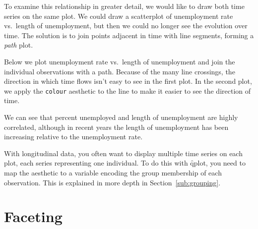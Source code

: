 % 


To examine this relationship in greater detail, we would like to draw both time series on the same plot. We could draw a scatterplot of unemployment rate vs.\ length of unemployment, but then we could no longer see the evolution over time. The solution is to join points adjacent in time with line segments, forming a \emph{path} plot.

Below we plot unemployment rate vs.\ length of unemployment and join the individual observations with a path. Because of the many line crossings, the direction in which time flows isn't easy to see in the first plot. In the second plot, we apply the {\tt colour} aesthetic to the line to make it easier to see the direction of time.

% 


We can see that percent unemployed and length of unemployment are highly correlated, although in recent years the length of unemployment has been increasing relative to the unemployment rate.

With longitudinal data, you often want to display multiple time series on each plot, each series representing one individual.  To do this with \f{qplot}, you need to map the  aesthetic to a variable encoding the group membership of each observation. This is explained in more depth in Section~\ref{sub:grouping}.

\section{Faceting}\label{sec:qplot-faceting}

